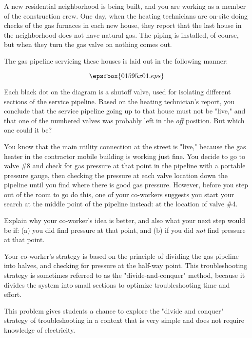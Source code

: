 

A new residential neighborhood is being built, and you are working as a member of the construction crew.  One day, when the heating technicians are on-site doing checks of the gas furnaces in each new house, they report that the last house in the neighborhood does not have natural gas.  The piping is installed, of course, but when they turn the gas valve on nothing comes out.

The gas pipeline servicing these houses is laid out in the following manner:

$$\epsfbox{01595x01.eps}$$

Each black dot on the diagram is a shutoff valve, used for isolating different sections of the service pipeline.  Based on the heating technician's report, you conclude that the service pipeline going up to that house must not be "live," and that one of the numbered valves was probably left in the {\it off} position.  But which one could it be?

You know that the main utility connection at the street is "live," because the gas heater in the contractor mobile building is working just fine.  You decide to go to valve \#8 and check for gas pressure at that point in the pipeline with a portable pressure gauge, then checking the pressure at each valve location down the pipeline until you find where there is good gas pressure.  However, before you step out of the room to go do this, one of your co-workers suggests you start your search at the middle point of the pipeline instead: at the location of valve \#4.

Explain why your co-worker's idea is better, and also what your next step would be if: (a) you did find pressure at that point, and (b) if you did {\it not} find pressure at that point.







Your co-worker's strategy is based on the principle of dividing the gas pipeline into halves, and checking for pressure at the half-way point.  This troubleshooting strategy is sometimes referred to as the "divide-and-conquer" method, because it divides the system into small sections to optimize troubleshooting time and effort.







This problem gives students a chance to explore the "divide and conquer" strategy of troubleshooting in a context that is very simple and does not require knowledge of electricity.




